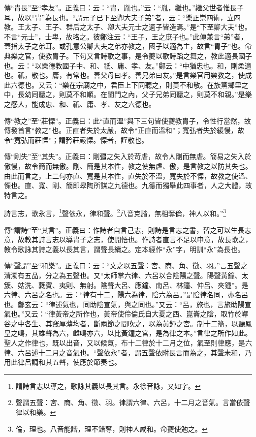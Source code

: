 {\noindent\zhuan{}\fzbyks 傳“胄長”至“孝友”。正義曰：云：“胄，胤也。”云：“胤，繼也。”繼父世者惟長子耳，故以“胄”為長也。“謂元子已下至卿大夫子弟”者，云：“樂正崇四術，立四教。王太子、王子、群后之太子、卿大夫元士之適子皆造焉。”是“下至卿大夫”也。不言“元士”，士卑，故略之。彼鄭注云：“王子，王之庶子也。”此傳兼言“弟”者，蓋指太子之弟耳。或孔意公卿大夫之弟亦教之，國子以適為主，故言“胄子”也。命典樂之官，使教胄子。下句又言詩歌之事，是令夔以歌詩蹈之舞之，教此適長國子也。云：“以樂德教國子中、和、祇、庸、孝、友。”鄭云：“中猶忠也。和，剛柔適也。祇，敬也。庸，有常也。善父母曰孝。善兄弟曰友。”是言樂官用樂教之，使成此六德也。又云：“樂在宗廟之中，君臣上下同聽之，則莫不和敬。在族黨鄉里之中，長幼同聽之，則莫不和順。在閨門之內，父子兄弟同聽之，則莫不和親。”是樂之感人，能成忠、和、祇、庸、孝、友之六德也。 \par}

{\noindent\zhuan{}\fzbyks 傳“教之”至“莊慄”。正義曰：此“直而溫”與下三句皆使夔教胄子，令性行當然，故傳發首言“教之”也。正直者失於太嚴，故令“正直而溫和”；寬弘者失於緩慢，故令“寬弘而莊慄”；謂矜莊嚴慄。慄者，謹敬也。 \par}

{\noindent\zhuan{}\fzbyks 傳“剛失”至“其失”。正義曰：剛彊之失入於苛虐，故令人剛而無虐。簡易之失入於傲慢，故令簡而無傲。剛、簡是其本性，教之使無虐、傲，是言教之以防其失也。由此而言之，上二句亦直、寬是其本性，直失於不溫，寬失於不慄，故教之使溫、慄也。直、寬、剛、簡即皋陶所謀之九德也。九德而獨舉此四事者，人之大體，故特言之。 \par}

詩言志，歌永言，\footnote{謂詩言志以導之，歌詠其義以長其言。永徐音詠，又如字。}聲依永，律和聲。\footnote{聲謂五聲：宮、商、角、徵、羽。律謂六律、六呂，十二月之音氣。言當依聲律以和樂。}八音克諧，無相奪倫，神人以和。”\footnote{倫，理也。八音能諧，理不錯奪，則神人咸和。命夔使勉之。}

{\noindent\zhuan{}\fzbyks 傳“謂詩”至“其言”。正義曰：作詩者自言己志，則詩是言志之書，習之可以生長志意，故教其詩言志以導胄子之志，使開悟也。作詩者直言不足以申意，故長歌之，教令歌詠其詩之義以長其言，謂聲長續之。定本經作“永”字，明訓“永”為長也。 \par}

{\noindent\zhuan{}\fzbyks 傳“聲謂”至“和樂”。正義曰：云：“文之以五聲：宮、商、角、徵、羽。”言五聲之清濁有五品，分之為五聲也。又“太師掌六律、六呂以合陰陽之聲。陽聲黃鐘、太簇、姑洗、蕤賓、夷則、無射。陰聲大呂、應鐘、南呂、林鐘、仲呂、夾鍾”。是六律、六呂之名也。云：“律有十二，陽六為律，陰六為呂。”是陰律名同，亦名呂也。鄭玄云：“律述氣也，同助陰宣氣，與之同也。”又云：“呂，旅也，言旅助陽宣氣也。”又云：“律黃帝之所作也，黃帝使伶倫氏自大夏之西、崑崙之陰，取竹於嶰谷之中各生、其竅厚薄均者，斷兩節之間吹之，以為黃鐘之宮。制十二籥，以聽鳳皇之鳴，其雄聲為六，雌鳴亦六，以比黃鐘之宮，是為律之本。”言律之所作如此。聖人之作律也，既以出音，又以候氣，布十二律於十二月之位，氣至則律應，是六律、六呂述十二月之音氣也。“聲依永”者，謂五聲依附長言而為之，其聲未和，乃用此律呂調和其五聲，使應於節奏也。 \par}

